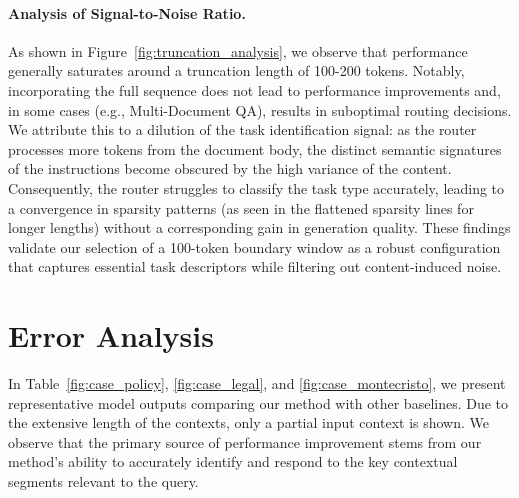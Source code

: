 \paragraph{Analysis of Signal-to-Noise Ratio.}
As shown in Figure~\ref{fig:truncation_analysis}, we observe that performance generally saturates around a truncation length of 100-200 tokens.
Notably, incorporating the full sequence does not lead to performance improvements and, in some cases (e.g., Multi-Document QA), results in suboptimal routing decisions.
We attribute this to a dilution of the task identification signal: as the router processes more tokens from the document body, the distinct semantic signatures of the instructions become obscured by the high variance of the content.
Consequently, the router struggles to classify the task type accurately, leading to a convergence in sparsity patterns (as seen in the flattened sparsity lines for longer lengths) without a corresponding gain in generation quality.
These findings validate our selection of a 100-token boundary window as a robust configuration that captures essential task descriptors while filtering out content-induced noise.

\section{Error Analysis}
In Table~\ref{fig:case_policy}, \ref{fig:case_legal}, and \ref{fig:case_montecristo}, we present representative model outputs comparing our method with other baselines. 
Due to the extensive length of the contexts, only a partial input context is shown. 
We observe that the primary source of performance improvement stems from our method's ability to accurately identify and respond to the key contextual segments relevant to the query.

\label{appdix:error_analysis}

